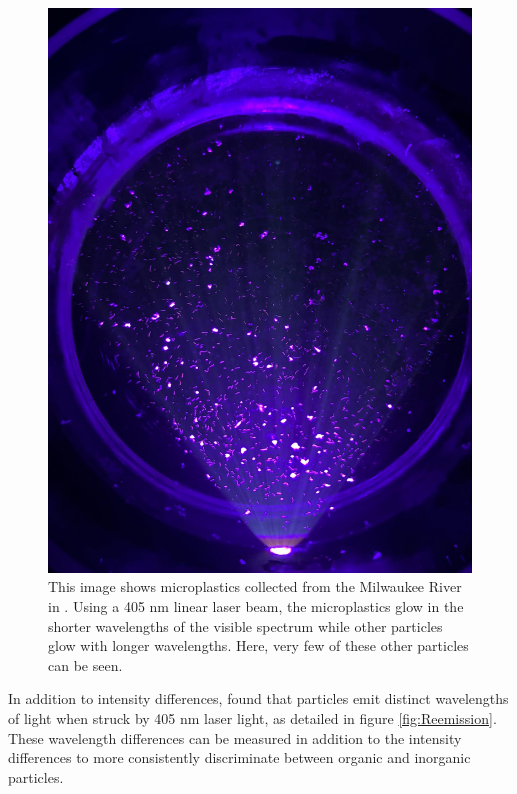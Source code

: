 \documentclass[fleqn,10pt]{SelfArx} %
\begin{document}
	\begin{figure}[h]
		\centering
		\includegraphics[width=1\linewidth]{Figures/FluorescedMPs2}
		\caption[Microplastics Fluorescing]{This image shows microplastics collected from the Milwaukee River in \cite{Isahaku}. Using a 405 nm linear laser beam, the microplastics glow in the shorter wavelengths of the visible spectrum while other particles glow with longer wavelengths. Here, very few of these other particles can be seen.}
		\label{fig:FluorescedMPs}
	\end{figure}
	
	In addition to intensity differences, \cite{Wohlschläger_Versen_Löder_Laforsch_2024} found that particles emit distinct wavelengths of light when struck by 405 nm laser light, as detailed in figure \ref{fig:Reemission}. These wavelength differences can be measured in addition to the intensity differences to more consistently discriminate between organic and inorganic particles.
	
\end{document}
